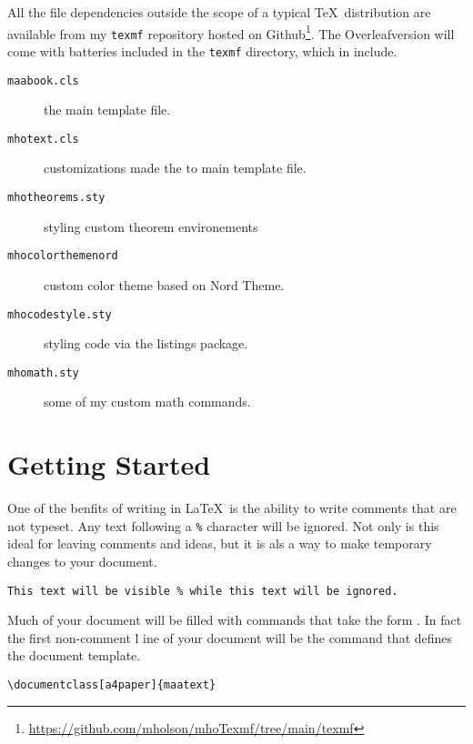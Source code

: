 All the file dependencies outside the scope of a typical \TeX\, distribution
are available from my \texttt{texmf} repository hosted on
Github\footnote{\url{https://github.com/mholson/mhoTexmf/tree/main/texmf}}.
The Overleaf\texttrademark version will come with batteries included in the 
\texttt{texmf} directory, which in include.  
\begin{description}
    \item[\texttt{maabook.cls}] the main template file.
    \item[\texttt{mhotext.cls}] customizations made the to main template file.
    \item[\texttt{mhotheorems.sty}] styling custom theorem environements
    \item[\texttt{mhocolorthemenord}] custom color theme based on Nord Theme.
    \item[\texttt{mhocodestyle.sty}] styling code via the listings package.
    \item[\texttt{mhomath.sty}] some of my custom math commands.  
\end{description}


\section{Getting Started}

One of the benfits of writing in \LaTeX\, is the ability to write comments
that are not typeset.  Any text following a \lstinline{%} character will be 
ignored.  Not only is this ideal for leaving comments and ideas, but it is 
als a way to make temporary changes to your document.
\lstset{style=mhotexcode}
\begin{lstlisting}[belowskip=-2 \baselineskip]
% This code will be ignored
This text will be visible % while this text will be ignored.
\end{lstlisting}
Much of your document will be filled with commands that take the form 
. In fact the first non-comment l
ine of your document will be the command that defines the document template.
\begin{lstlisting}
\documentclass[a4paper]{maatext}
\end{lstlisting}
